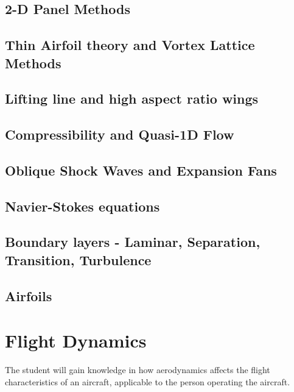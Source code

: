 \documentclass[12pt]{article}
\begin{document}
	\subsection{2-D Panel Methods}
	\subsection{Thin Airfoil theory and Vortex Lattice Methods}
	\subsection{Lifting line and high aspect ratio wings}
	\subsection{Compressibility and Quasi-1D Flow }
	\subsection{Oblique Shock Waves and Expansion Fans}
	\subsection{Navier-Stokes equations}
	\subsection{Boundary layers - Laminar, Separation, Transition, Turbulence}
	\subsection{Airfoils}
\section{Flight Dynamics}
The student will gain knowledge in how aerodynamics affects the flight characteristics of an aircraft, applicable to the person operating the aircraft. 
\end{document}

